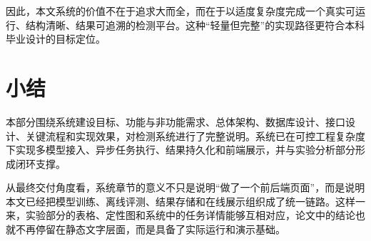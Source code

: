 因此，本文系统的价值不在于追求大而全，而在于以适度复杂度完成一个真实可运行、结构清晰、结果可追溯的检测平台。这种“轻量但完整”的实现路径更符合本科毕业设计的目标定位。

\section{小结}

本部分围绕系统建设目标、功能与非功能需求、总体架构、数据库设计、接口设计、关键流程和实现效果，对检测系统进行了完整说明。系统已在可控工程复杂度下实现多模型接入、异步任务执行、结果持久化和前端展示，并与实验分析部分形成闭环支撑。

从最终交付角度看，系统章节的意义不只是说明“做了一个前后端页面”，而是说明本文已经把模型训练、离线评测、结果存储和在线展示组织成了统一链路。这样一来，实验部分的表格、定性图和系统中的任务详情能够互相对应，论文中的结论也就不再停留在静态文字层面，而是具备了实际运行和演示基础。
